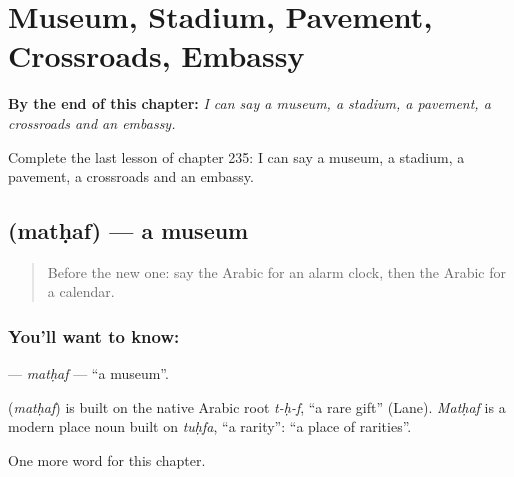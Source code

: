 
\chapter{Museum, Stadium, Pavement, Crossroads, Embassy}
\label{ch:ar-museum-stadium-pavement-crossroads-embassy}

\begin{chapteropening}
\textbf{By the end of this chapter:} \emph{I can say a museum, a stadium, a pavement, a crossroads and an embassy.}

Complete the last lesson of chapter 235: I can say a museum, a stadium, a pavement, a crossroads and an embassy.
\end{chapteropening}

\section[\texorpdfstring{\ar{متحف} (matḥaf)}{متحف (matḥaf)}]{ (matḥaf) — a museum}

\label{lesson:AR-C235-mathaf}



\begin{quote}
Before the new one: say the Arabic for an alarm clock, then the Arabic for a calendar.
\end{quote}

\subsection*{You'll want to know: }
\textbf{} — \emph{matḥaf} — \textquotedblleft{}a museum\textquotedblright{}.

\begin{cousinweb}
\textbf{} (\emph{matḥaf}) is built on the native Arabic root \emph{t-ḥ-f}, \textquotedblleft{}a rare gift\textquotedblright{} (Lane). \emph{Matḥaf} is a modern place noun built on \emph{tuḥfa}, \textquotedblleft{}a rarity\textquotedblright{}: \textquotedblleft{}a place of rarities\textquotedblright{}.
\end{cousinweb}

\begin{grammarlens}[title={What you've built}]
One more word for this chapter.
\end{grammarlens}

